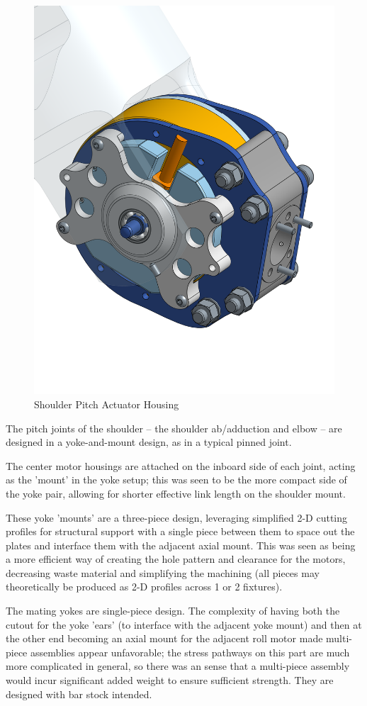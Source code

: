 \documentclass{article}
\begin{document}
\begin{figure}
    \centering
    \includegraphics[width=0.5\linewidth]{assets/MOHRA/Sub-Arm/ShoulderPitch_Rear.png}
    \caption{Shoulder Pitch Actuator Housing}
    \label{fig:enter-label}
\end{figure}

The pitch joints of the shoulder -- the shoulder ab/adduction and elbow -- are designed in a yoke-and-mount design, as in a typical pinned joint. 

The center motor housings are attached on the inboard side of each joint, acting as the 'mount' in the yoke setup; this was seen to be the more compact side of the yoke pair, allowing for shorter effective link length on the shoulder mount. 

These yoke 'mounts' are a three-piece design, leveraging simplified 2-D cutting profiles for structural support with a single piece between them to space out the plates and interface them with the adjacent axial mount. This was seen as being a more efficient way of creating the hole pattern and clearance for the motors, decreasing waste material and simplifying the machining (all pieces may theoretically be produced as 2-D profiles across 1 or 2 fixtures).

The mating yokes are single-piece design. The complexity of having both the cutout for the yoke 'ears' (to interface with the adjacent yoke mount) and then at the other end becoming an axial mount for the adjacent roll motor made multi-piece assemblies appear unfavorable; the stress pathways on this part are much more complicated in general, so there was an sense that a multi-piece assembly would incur significant added weight to ensure sufficient strength. They are designed with bar stock intended. 
\end{document}
